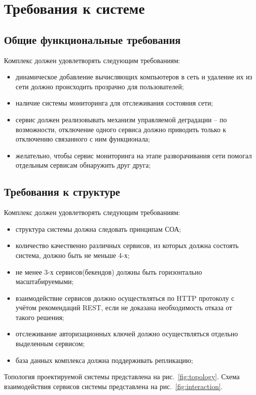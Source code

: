 \documentclass[a4paper,12pt]{report}
\numberwithin{equation}{section}
\begin{document}
\section{Требования к системе}
\subsection{Общие функциональные требования}
Комплекс должен удовлетворять следующим требованиям:

\begin{itemize}
  \item динамическое добавление вычисляющих компьютеров в сеть и удаление их из сети должно происходить прозрачно для пользователей;
  \item наличие системы мониторинга для отслеживания состояния сети;
  \item сервис должен реализовывать механизм управляемой деградации -- по возможности, отключение одного сервиса должно приводить только к отключению связанного с ним функционала;
  \item желательно, чтобы сервис мониторинга на этапе разворачивания сети помогал отдельным сервисам обнаружить друг друга;
  
\end{itemize}

\subsection{Требования к структуре}
Комплекс должен удовлетворять следующим требованиям:
\begin{itemize}
  \item структура системы должна следовать принципам СОА;
  \item количество качественно различных сервисов, из которых должна состоять система, должно быть не меньше 4-х;
  \item не менее 3-х сервисов(бекендов) должны быть горизонтально масштабируемыми;
  \item взаимодействие сервисов должно осуществляться по HTTP протоколу с учётом рекомендаций REST, если не доказана необходимость отказа от такого решения;
  \item отслеживание авторизационных ключей должно осуществляться отдельно выделенным сервисом;
  \item база данных комплекса должна поддерживать репликацию; 
\end{itemize}

Топология проектируемой системы представлена на рис.~\ref{fig:topology}.
Схема взаимодействия сервисов системы представлена на рис.~\ref{fig:interaction}.
\end{document}

